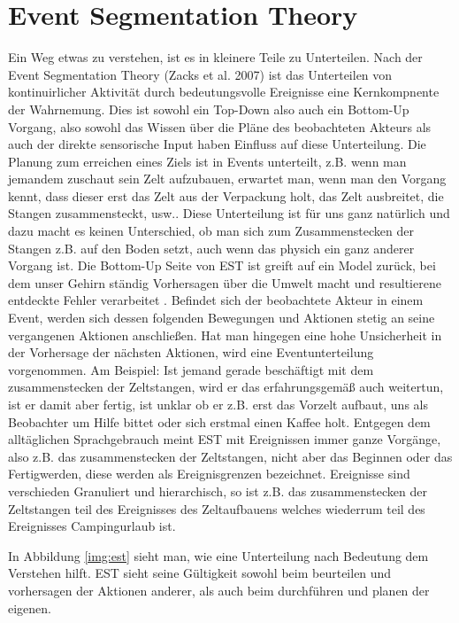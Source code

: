 \section{Event Segmentation Theory}
Ein Weg etwas zu verstehen, ist es in kleinere Teile zu Unterteilen. Nach der Event Segmentation Theory (Zacks et al. 2007) ist das Unterteilen von kontinuirlicher Aktivität durch bedeutungsvolle Ereignisse eine Kernkompnente der Wahrnemung. \cite{bib:est} Dies ist sowohl ein Top-Down also auch ein Bottom-Up Vorgang, also sowohl das Wissen über die Pläne des beobachteten Akteurs als auch der direkte sensorische Input haben Einfluss auf diese Unterteilung.\cite{bib:est1} Die Planung zum erreichen eines Ziels ist in Events unterteilt, z.B. wenn man jemandem zuschaut sein Zelt aufzubauen, erwartet man, wenn man den Vorgang kennt, dass dieser erst das Zelt aus der Verpackung holt, das Zelt ausbreitet, die Stangen zusammensteckt, usw.. Diese Unterteilung ist für uns ganz natürlich und dazu macht es keinen Unterschied, ob man sich zum Zusammenstecken der Stangen z.B. auf den Boden setzt, auch wenn das physich ein ganz anderer Vorgang ist. Die Bottom-Up Seite von EST ist greift auf ein Model zurück, bei dem unser Gehirn ständig Vorhersagen über die Umwelt macht und resultierene entdeckte Fehler verarbeitet \cite{bib:est1}. Befindet sich der beobachtete Akteur in einem Event, werden sich dessen folgenden Bewegungen und Aktionen stetig an seine vergangenen Aktionen anschließen. Hat man hingegen eine hohe Unsicherheit in der Vorhersage der nächsten Aktionen, wird eine Eventunterteilung vorgenommen. Am Beispiel: Ist jemand gerade beschäftigt mit dem zusammenstecken der Zeltstangen, wird er das erfahrungsgemäß auch weitertun, ist er damit aber fertig, ist unklar ob er z.B. erst das Vorzelt aufbaut, uns als Beobachter um Hilfe bittet oder sich erstmal einen Kaffee holt. 
Entgegen dem alltäglichen Sprachgebrauch meint EST mit Ereignissen immer ganze Vorgänge, also z.B. das zusammenstecken der Zeltstangen, nicht aber das Beginnen oder das Fertigwerden, diese werden als Ereignisgrenzen bezeichnet. Ereignisse sind verschieden Granuliert und hierarchisch, so ist z.B. das zusammenstecken der Zeltstangen teil des Ereignisses des Zeltaufbauens welches wiederrum teil des Ereignisses Campingurlaub ist.

In Abbildung \ref{img:est} sieht man, wie eine Unterteilung nach Bedeutung dem Verstehen hilft. EST sieht seine Gültigkeit sowohl beim beurteilen und vorhersagen der Aktionen anderer, als auch beim durchführen und planen der eigenen.



